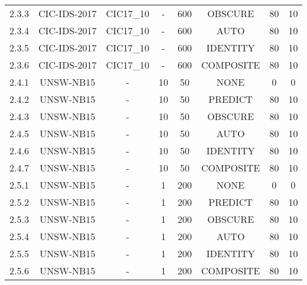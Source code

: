 \begin{table}[h]
{\begin{tabular}{cccccccc}
		2.3.3 \label{ex_2_3_3} & CIC-IDS-2017 & CIC17\_10  & -           & 600           & OBSCURE      & 80        & 10          \\
		2.3.4 \label{ex_2_3_4} & CIC-IDS-2017 & CIC17\_10  & -           & 600           & AUTO       & 80        & 10          \\
		2.3.5 \label{ex_2_3_5} & CIC-IDS-2017 & CIC17\_10  & -           & 600           & IDENTITY   & 80        & 10          \\
		2.3.6 \label{ex_2_3_6} & CIC-IDS-2017 & CIC17\_10  & -           & 600           & COMPOSITE  & 80        & 10          \\
		2.4.1 \label{ex_2_4_1} & UNSW-NB15    & -          & 10          & 50            & NONE       & 0         & 0           \\
		2.4.2 \label{ex_2_4_2} & UNSW-NB15    & -          & 10          & 50            & PREDICT    & 80        & 10          \\
		2.4.3 \label{ex_2_4_3} & UNSW-NB15    & -          & 10          & 50            & OBSCURE      & 80        & 10          \\
		2.4.5 \label{ex_2_4_4} & UNSW-NB15    & -          & 10          & 50            & AUTO       & 80        & 10          \\
		2.4.6 \label{ex_2_4_5} & UNSW-NB15    & -          & 10          & 50            & IDENTITY   & 80        & 10          \\
		2.4.7 \label{ex_2_4_6} & UNSW-NB15    & -          & 10          & 50            & COMPOSITE  & 80        & 10          \\
		2.5.1 \label{ex_2_5_1} & UNSW-NB15    & -          & 1           & 200           & NONE       & 0         & 0           \\
		2.5.2 \label{ex_2_5_2} & UNSW-NB15    & -          & 1           & 200           & PREDICT    & 80        & 10          \\
		2.5.3 \label{ex_2_5_3} & UNSW-NB15    & -          & 1           & 200           & OBSCURE      & 80        & 10          \\
		2.5.4 \label{ex_2_5_4} & UNSW-NB15    & -          & 1           & 200           & AUTO       & 80        & 10          \\
		2.5.5 \label{ex_2_5_5} & UNSW-NB15    & -          & 1           & 200           & IDENTITY   & 80        & 10          \\
		2.5.6 \label{ex_2_5_6} & UNSW-NB15    & -          & 1           & 200           & COMPOSITE  & 80        & 10          \\

\end{tabular}}
\end{table}
